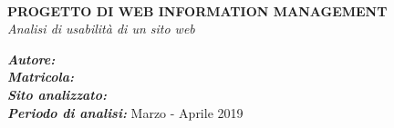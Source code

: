 \begin{titlepage}
	\HRule \\[0.4cm]
	{ \huge \bfseries PROGETTO DI WEB INFORMATION MANAGEMENT}\\[0.6cm] %
	{ \huge \emph{Analisi di usabilità di un sito web} }
	\HRule \\[1cm]
	
	
	\vspace{1cm}
	
	\begin{minipage}{0.5\textwidth}
		\begin{flushleft} 
			\center
			\emph{\bfseries Autore: }\nomeStudente\ \cognomeStudente\ \\
			\emph{\bfseries Matricola: }\matricolaStudente \\
			\emph{\bfseries Sito analizzato: } \linkSito \\
			\emph{\bfseries Periodo di analisi: } Marzo - Aprile 2019
		\end{flushleft}
	\end{minipage}
	
\end{titlepage}

\tableofcontents
\newpage